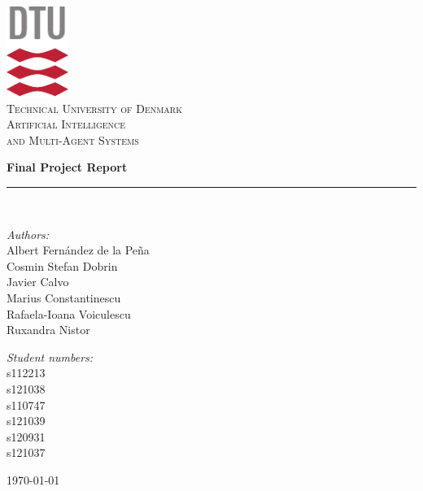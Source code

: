 \documentclass[10pt,oneside]{article}
\begin{document}
 
\begin{titlepage}
\begin{center}
\includegraphics[width=0.15\textwidth]{figures/DTU-logo.pdf}\\[1.3cm]

\textsc{\LARGE Technical University of Denmark}\\[0.8cm]
\textsc{\LARGE Artificial Intelligence \\[0.1cm]and Multi-Agent Systems}

{
 \vspace{1.5cm}
 \huge \bfseries Final Project Report}\\
 \vspace{2.5cm}
 \rule{\linewidth}{0.1mm} \\[0.4cm]
\begin{minipage}{0.4\textwidth}
    \begin{flushleft} \large
	\emph{Authors:}\\
    Albert Fernández de la Peña \\
    Cosmin Stefan Dobrin\\
    Javier Calvo\\
    Marius Constantinescu\\
    Rafaela-Ioana Voiculescu\\
	Ruxandra Nistor
	\end{flushleft}
\end{minipage}
\begin{minipage}{0.4\textwidth}
	\begin{flushright} \large
	\emph{Student numbers:} \\
    s112213\\
    s121038\\
    s110747\\
    s121039\\
	s120931\\
    s121037
	\end{flushright}
\end{minipage}
\vfill
{\large \today}
\end{center}


\end{titlepage}
\end{document}
